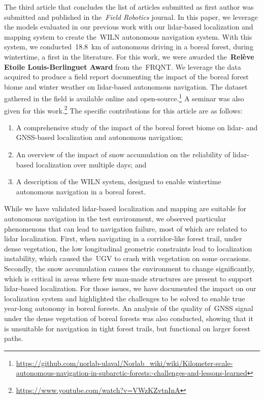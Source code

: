 \documentclass[12pt,letterpaper,oneside]{article}
\begin{document}
The third article that concludes the list of articles submitted as first author was submitted and published in the~\emph{Field Robotics} journal.
In this paper, we leverage the models evaluated in our previous work with our lidar-based localization and mapping system to create the~\ac{WILN} autonomous navigation system. 
With this system, we conducted~\SI{18.8}{\kilo\meter} of autonomous driving in a boreal forest, during wintertime, a first in the literature.
For this work, we were awarded the~\textbf{Relève Etoile Louis-Berlinguet Award} from the~\ac{FRQNT}.
We leverage the data acquired to produce a field report documenting the impact of the boreal forest biome and winter weather on lidar-based autonomous navigation.
The dataset gathered in the field is available online and open-source.\footnote{\textwidth\url{https://github.com/norlab-ulaval/Norlab_wiki/wiki/Kilometer-scale-autonomous-navigation-in-subarctic-forests:-challenges-and-lessons-learned}}
A seminar was also given for this work.\footnote{\url{https://www.youtube.com/watch?v=VWzKZvtnInA}}
The specific contributions for this article are as follows:
\begin{enumerate}
	\item A comprehensive study of the impact of the boreal forest biome on lidar- and \ac{GNSS}-based localization and autonomous navigation;  
	\item An overview of the impact of snow accumulation on the reliability of lidar-based localization over multiple days; and
	\item A description of the \ac{WILN} system, designed to enable wintertime autonomous navigation in a boreal forest.
\end{enumerate}
While we have validated lidar-based localization and mapping are suitable for autonomous navigation in the test environment, we observed particular phenomenons that can lead to navigation failure, most of which are related to lidar localization.
First, when navigating in a corridor-like forest trail, under dense vegetation, the low longitudinal geometric constraints lead to localization instability, which caused the~\ac{UGV} to crash with vegetation on some occasions.
Secondly, the snow accumulation causes the environment to change significantly, which is critical in areas where few man-made structures are present to support lidar-based localization.
For those issues, we have documented the impact on our localization system and highlighted the challenges to be solved to enable true year-long autonomy in boreal forests.
An analysis of the quality of~\ac{GNSS} signal under the dense vegetation of boreal forests was also conducted, showing that it is unsuitable for navigation in tight forest trails, but functional on larger forest paths.
\end{document}
